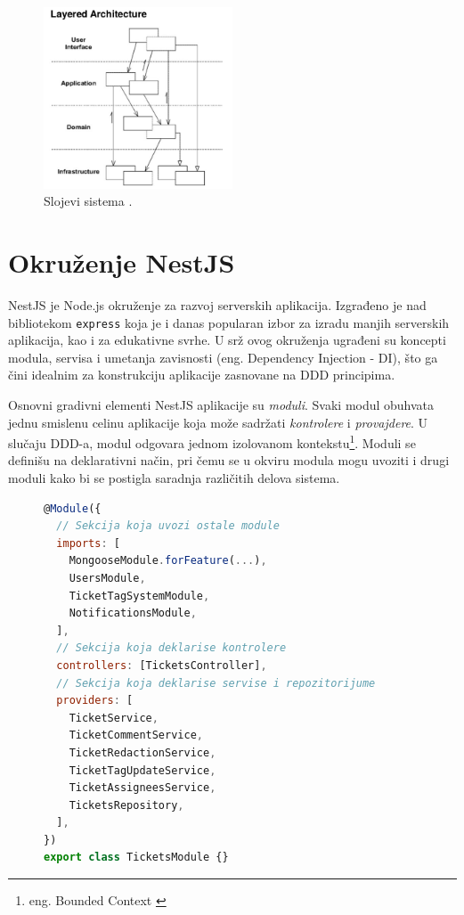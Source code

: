 \documentclass[12pt,oneside]{memoir}
\begin{document}
\begin{figure}[h]
  \centering
  \includegraphics[width=0.5\textwidth]{docs/images/ch_2/DDD-Layered-Architecture-2.png} 
  \caption{Slojevi sistema \cite{dddfull}.}
  \label{fig:sample}
\end{figure}

\section{Okruženje NestJS}

NestJS \cite{nestjsdocs} je Node.js okruženje za razvoj serverskih aplikacija. Izgrađeno je nad bibliotekom \verb|express| \cite{expressjsdocs} koja je i danas popularan izbor za izradu manjih serverskih aplikacija, kao i za edukativne svrhe.  U srž ovog okruženja ugrađeni su koncepti modula, servisa i umetanja zavisnosti (eng. Dependency Injection - DI), što ga čini idealnim za konstrukciju aplikacije zasnovane na DDD principima.

Osnovni gradivni elementi NestJS aplikacije su \textit{moduli}. Svaki modul obuhvata jednu smislenu celinu aplikacije koja može sadržati \textit{kontrolere} i \textit{provajdere}. U slučaju DDD-a, modul odgovara jednom izolovanom kontekstu\footnote{eng. Bounded Context \cite{dddfull}}. Moduli se definišu na deklarativni način, pri čemu se u okviru modula mogu uvoziti i drugi moduli kako bi se postigla saradnja različitih delova sistema.

\begin{figure}[h]
\begin{lstlisting}[language=JavaScript, style=ES6, caption={Deklaracija modula za kartice.}, label={lst:nestjs_module}]
@Module({
  // Sekcija koja uvozi ostale module
  imports: [
    MongooseModule.forFeature(...),
    UsersModule,
    TicketTagSystemModule,
    NotificationsModule,
  ],
  // Sekcija koja deklarise kontrolere
  controllers: [TicketsController],
  // Sekcija koja deklarise servise i repozitorijume
  providers: [
    TicketService,
    TicketCommentService,
    TicketRedactionService,
    TicketTagUpdateService,
    TicketAssigneesService,
    TicketsRepository,
  ],
})
export class TicketsModule {}
\end{lstlisting}
\end{figure}
\end{document}
